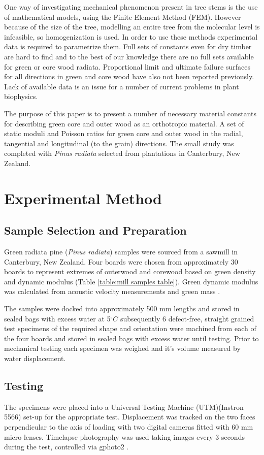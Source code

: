 \documentclass[10pt]{article}
\begin{document}
One way of investigating mechanical phenomenon present in tree stems is the use of mathematical models, using the
Finite Element Method (FEM). However because of the size of the tree, modelling an entire tree from the molecular
level is infeasible, so homogenization is used. In order to use these methods experimental data is required to parametrize them.
Full sets of constants even for dry timber are hard to find and to the best of our knowledge there are no full sets available
for green or core wood radiata. Proportional limit and ultimate failure surfaces for all directions in green and core wood
have also not been reported previously. Lack of available data is an issue for a number of current problems in plant biophysics.

The purpose of this paper is to present a number of necessary material constants
for describing green core and outer wood as an orthotropic material.
A set of static moduli and Poisson ratios for green core and outer wood in the radial, tangential
and longitudinal (to the grain) directions. The small study was completed with \textit{Pinus radiata}
selected from plantations in Canterbury, New Zealand.

\section{Experimental Method}
\subsection{Sample Selection and Preparation}
Green radiata pine (\textit{Pinus radiata}) samples were sourced from a sawmill
in Canterbury, New Zealand. Four boards were chosen from approximately
30 boards to represent extremes of outerwood and corewood based on green density
and dynamic modulus (Table \ref{table:mill samples table}). Green dynamic
modulus was calculated from acoustic velocity measurements and green mass \citep{Chauhan_methods_2013}.

The samples were docked into approximately 500 mm lengths and stored in sealed
bags with excess water at 5\(^\circ C\)  subsequently 6 defect-free, straight
grained test specimens of the required shape and orientation were machined from each of
the four boards and stored in sealed bags with excess water until testing.
Prior to mechanical testing each specimen was weighed and it's volume measured
by water displacement.

\subsection{Testing}
The specimens were placed into a Universal Testing Machine (UTM)(Instron 5566)
set-up for the appropriate test. Displacement was tracked on the two faces
perpendicular to the axis of loading with two digital cameras fitted with 60 mm
micro lenses. Timelapse photography was used taking images
every 3 seconds during the test, controlled via gphoto2 \citep{contributors_gphoto2_2002}.
\end{document}
